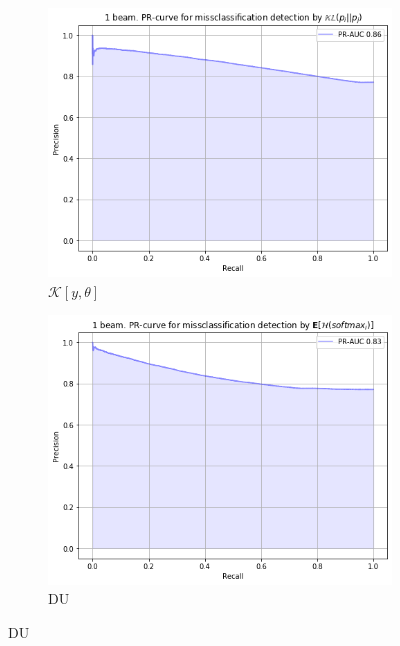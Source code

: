 \documentclass[a4paper,14pt]{extarticle}
\begin{document}
	\begin{figure}[t]
		\begin{subfigure}{.45\textwidth}
			\centering
			\includegraphics[width=1\textwidth]{images/malinin_eq_kl.png}
			\caption{$\mathcal{K}[y, \theta]$}
		\end{subfigure}
		\begin{subfigure}{.45\textwidth}
			\centering
			\includegraphics[width=1\textwidth]{images/malinin_eq_du.png}
			\caption{DU}
		\end{subfigure}
	\end{figure}
	
\end{document}
